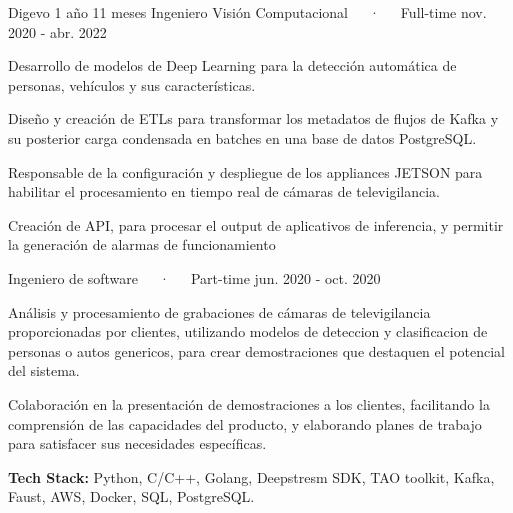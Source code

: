 \begin{cventries}
  \cvmultientry
    {Digevo} %
    {1 año 11 meses}
    {Ingeniero Visión Computacional~~~·~~~Full-time} %
    {nov. 2020 - abr. 2022} %
    {
      \begin{cvitems} %
        \item {Desarrollo de modelos de Deep Learning para la detección automática de personas, vehículos y sus características.}
        \item {Diseño y creación de ETLs para transformar los metadatos de flujos de Kafka y su posterior carga condensada en
         batches en una base de datos PostgreSQL.}
        \item {Responsable de la configuración y despliegue de los appliances JETSON para habilitar el procesamiento en tiempo real
         de cámaras de televigilancia.}
         \item {Creación de API, para procesar el output de aplicativos de inferencia, y permitir la generación de alarmas de
          funcionamiento}
      \end{cvitems}
    }
    {Ingeniero de software~~~·~~~Part-time} %
    {jun. 2020 - oct. 2020} %
    {
      \begin{cvitems} %
        \item {Análisis y procesamiento de grabaciones de cámaras de televigilancia proporcionadas por clientes, utilizando modelos
        de deteccion y clasificacion de personas o autos genericos, para crear demostraciones que destaquen el potencial del sistema.}
        \item {Colaboración en la presentación de demostraciones a los clientes, facilitando la comprensión de las capacidades del
        producto, y elaborando planes de trabajo para satisfacer sus necesidades específicas.}
      \end{cvitems}
    }
    {
      \begin{cvitems} %
            \item {\textbf{Tech Stack:} Python, C/C++, Golang, Deepstresm SDK, TAO toolkit, Kafka, Faust, AWS, Docker, SQL, PostgreSQL.}
      \end{cvitems}
    }

\end{cventries}



    


